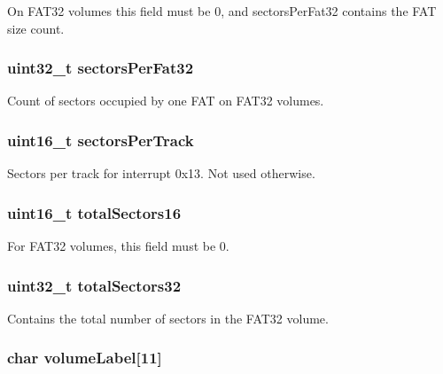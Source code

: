 On F\-A\-T32 volumes this field must be 0, and sectors\-Per\-Fat32 contains the F\-A\-T size count. \hypertarget{structfat32__boot_a687653b3b71ab0de1f27f8ab8f331a1c}{
\subsubsection[{sectors\-Per\-Fat32}]{\setlength{\rightskip}{0pt plus 5cm}uint32\-\_\-t sectors\-Per\-Fat32}}\label{structfat32__boot_a687653b3b71ab0de1f27f8ab8f331a1c}
Count of sectors occupied by one F\-A\-T on F\-A\-T32 volumes. \hypertarget{structfat32__boot_a42886f9109ee1759d5972e871f0689a8}{
\subsubsection[{sectors\-Per\-Track}]{\setlength{\rightskip}{0pt plus 5cm}uint16\-\_\-t sectors\-Per\-Track}}\label{structfat32__boot_a42886f9109ee1759d5972e871f0689a8}
Sectors per track for interrupt 0x13. Not used otherwise. \hypertarget{structfat32__boot_ad717f5b9af13f8ec9d0d6d1337174dfa}{
\subsubsection[{total\-Sectors16}]{\setlength{\rightskip}{0pt plus 5cm}uint16\-\_\-t total\-Sectors16}}\label{structfat32__boot_ad717f5b9af13f8ec9d0d6d1337174dfa}
For F\-A\-T32 volumes, this field must be 0. \hypertarget{structfat32__boot_a64d5902f9e900ecc745b1c0b325d875f}{
\subsubsection[{total\-Sectors32}]{\setlength{\rightskip}{0pt plus 5cm}uint32\-\_\-t total\-Sectors32}}\label{structfat32__boot_a64d5902f9e900ecc745b1c0b325d875f}
Contains the total number of sectors in the F\-A\-T32 volume. \hypertarget{structfat32__boot_a253960050a38d2bfb2f57e86769aca62}{
\subsubsection[{volume\-Label}]{\setlength{\rightskip}{0pt plus 5cm}char volume\-Label\mbox{[}11\mbox{]}}}\label{structfat32__boot_a253960050a38d2bfb2f57e86769aca62}
